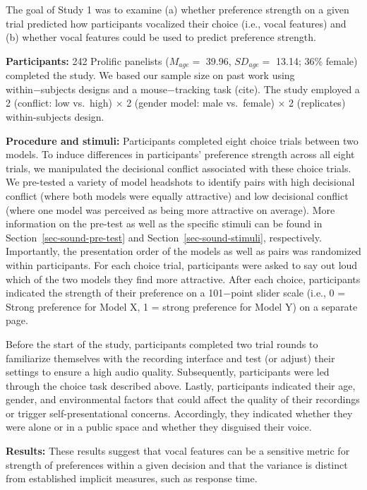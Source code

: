 \documentclass[
  a4paper,
]{scrreprt}
\begin{document}
The goal of Study 1 was to examine (a) whether preference strength on a
given trial predicted how participants vocalized their choice (i.e.,
vocal features) and (b) whether vocal features could be used to predict
preference strength.

\textbf{Participants:} 242 Prolific panelists (\(M_{age} =\) 39.96,
\(SD_{age} =\) 13.14; 36\% female) completed the study. We based our
sample size on past work using within−subjects designs and a
mouse−tracking task (cite). The study employed a 2 (conflict: low
vs.~high) × 2 (gender model: male vs.~female) × 2 (replicates)
within-subjects design.

\textbf{Procedure and stimuli:} Participants completed eight choice
trials between two models. To induce differences in participants'
preference strength across all eight trials, we manipulated the
decisional conflict associated with these choice trials. We pre-tested a
variety of model headshots to identify pairs with high decisional
conflict (where both models were equally attractive) and low decisional
conflict (where one model was perceived as being more attractive on
average). More information on the pre-test as well as the specific
stimuli can be found in Section~\ref{sec-sound-pre-test} and
Section~\ref{sec-sound-stimuli}, respectively. Importantly, the
presentation order of the models as well as pairs was randomized within
participants. For each choice trial, participants were asked to say out
loud which of the two models they find more attractive. After each
choice, participants indicated the strength of their preference on a
101−point slider scale (i.e., 0 = Strong preference for Model X, 1 =
strong preference for Model Y) on a separate page.

Before the start of the study, participants completed two trial rounds
to familiarize themselves with the recording interface and test (or
adjust) their settings to ensure a high audio quality. Subsequently,
participants were led through the choice task described above. Lastly,
participants indicated their age, gender, and environmental factors that
could affect the quality of their recordings or trigger
self-presentational concerns. Accordingly, they indicated whether they
were alone or in a public space and whether they disguised their voice.

\textbf{Results:} These results suggest that vocal features can be a
sensitive metric for strength of preferences within a given decision and
that the variance is distinct from established implicit measures, such
as response time.
\end{document}
